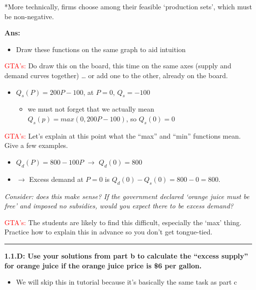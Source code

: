 \documentclass[]{article}
\providecommand{\tightlist}{%
  \setlength{\itemsep}{0pt}\setlength{\parskip}{0pt}}
\begin{document}
*More technically, firms choose among their feasible `production sets',
which must be non-negative.

\textbf{Ans:}

\begin{itemize}
\tightlist
\item
  Draw these functions on the same graph to aid intuition
\end{itemize}

\textcolor{red}{GTA's:} Do draw this on the board, this time on the same
axes (supply and demand curves together) \ldots{} or add one to the
other, already on the board.

\begin{itemize}
\tightlist
\item
  \(Q_s(P)=200P-100\), at \(P=0\), \(Q_s = -100\)

  \begin{itemize}
  \tightlist
  \item
    we must not forget that we actually mean \(Q_s(p)=max(0,200P-100)\),
    so \(Q_s(0) = 0\)
  \end{itemize}
\end{itemize}

\textcolor{red}{GTA's:} Let's explain at this point what the ``max'' and
``min'' functions mean. Give a few examples.

\begin{itemize}
\tightlist
\item
  \(Q_d(P)=800-100P\) \(\rightarrow\) \(Q_d(0)=800\)
\item
  \(\rightarrow\) Excess demand at \(P = 0\) is
  \(Q_d(0)-Q_s(0)=800-0 = 800\).
\end{itemize}

\emph{Consider: does this make sense? If the government declared `orange
juice must be free' and imposed no subsidies, would you expect there to
be excess demand?}

\textcolor{red}{GTA's:} The students are likely to find this difficult,
especially the `max' thing. Practice how to explain this in advance so
you don't get tongue-tied.

\begin{center}\rule{0.5\linewidth}{\linethickness}\end{center}

\textbf{1.1.D: Use your solutions from part b to calculate the ``excess
supply'' for orange juice if the orange juice price is \$6 per gallon.}

\begin{itemize}
\tightlist
\item
  We will skip this in tutorial because it's basically the same task as
  part c
\end{itemize}
\end{document}
